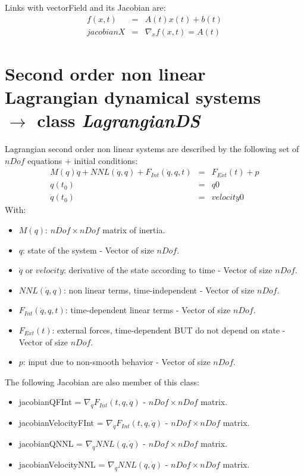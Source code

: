 \documentclass[10pt]{report}
\begin{document}
Links with vectorField and its Jacobian are: 
\begin{eqnarray}
  f(x,t) &=& A(t)x(t)+b(t) \\
  jacobianX&=&\nabla_x f(x,t) = A(t) 
\end{eqnarray}

\section{Second order non linear Lagrangian dynamical systems \\  $\rightarrow$ class \it{LagrangianDS}}

Lagrangian second order non linear systems are described by the following set of$nDof$ equations + initial conditions:
\begin{eqnarray}
 M(q) \ddot q + NNL(\dot q, q) + F_{Int}(\dot q , q , t) &=& F_{Ext}(t) + p \\
 q(t_0) &=& q0 \\
 \dot q(t_0) &=& velocity0 
\end{eqnarray}
With:
\begin{itemize}
\item $M(q)$: $nDof\times nDof$ matrix of inertia.
\item $q$: state of the system - Vector of size $nDof$.
\item $\dot q$ or $velocity$: derivative of the state according to time - Vector of size $nDof$.
\item $NNL(\dot q, q)$:  non linear terms, time-independent - Vector of size $nDof$.
\item $F_{Int}(\dot q , q , t)$: time-dependent linear terms - Vector of size $nDof$.
\item $F_{Ext}(t)$: external forces, time-dependent BUT do not depend on state - Vector of size $nDof$.
\item $p$: input due to non-smooth behavior - Vector of size $nDof$.
\end{itemize}

The following Jacobian are also member of this class:
\begin{itemize}
\item jacobianQFInt = $\nabla_q F_{Int}(t,q,\dot q)$ - $nDof\times nDof$ matrix.
\item jacobianVelocityFInt = $\nabla_{\dot q} F_{Int}(t,q,\dot q)$ - $nDof\times nDof$ matrix.
\item jacobianQNNL = $\nabla_q NNL(q,\dot q)$ - $nDof\times nDof$ matrix.
\item jacobianVelocityNNL = $\nabla_{\dot q}NNL(q,\dot q)$ - $nDof\times nDof$ matrix.
\end{itemize}
\end{document}
